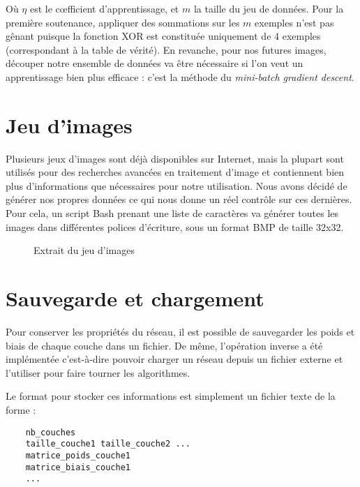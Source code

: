Où $\eta$ est le cœfficient d'apprentissage, et $m$ la taille du jeu de données.
Pour la première soutenance, appliquer des sommations sur les $m$ exemples n'est
pas gênant puisque la fonction XOR est constituée uniquement de 4 exemples
(correspondant à la table de vérité). En revanche, pour nos futures images,
découper notre ensemble de données va être nécessaire si l'on veut un
apprentissage bien plus efficace : c'est la méthode du \textit{mini-batch
gradient descent}.

\section{Jeu d'images}

Plusieurs jeux d'images sont déjà disponibles sur Internet, mais la plupart sont
utilisés pour des recherches avancées en traitement d'image et contiennent bien
plus d'informations que nécessaires pour notre utilisation. Nous avons décidé de
générer nos propres données ce qui nous donne un réel contrôle sur ces
dernières. Pour cela, un script Bash prenant une liste de caractères va générer
toutes les images dans différentes polices d'écriture, sous un format BMP de
taille 32x32.

\begin{figure}[H]
    \centering
    \caption{Extrait du jeu d'images}
\end{figure}

\newpage

\section{Sauvegarde et chargement}

Pour conserver les propriétés du réseau, il est possible de sauvegarder les
poids et biais de chaque couche dans un fichier. De même, l'opération inverse a
été implémentée c'est-à-dire pouvoir charger un réseau depuis un fichier externe
et l'utiliser pour faire tourner les algorithmes.

Le format pour stocker ces informations est simplement un fichier texte de la
forme :

\begin{verbatim}
    nb_couches
    taille_couche1 taille_couche2 ...
    matrice_poids_couche1
    matrice_biais_couche1
    ...
\end{verbatim}
